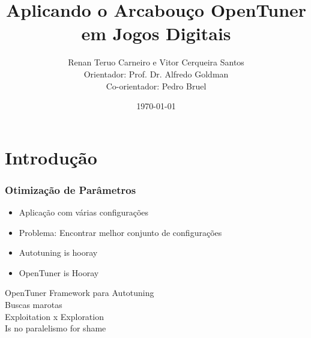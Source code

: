 \documentclass[10pt]{beamer}
\title{Aplicando o Arcabouço OpenTuner em Jogos Digitais}
\date{\today}
\author{Renan Teruo Carneiro e Vitor Cerqueira Santos\\
	Orientador: Prof. Dr. Alfredo Goldman\\
    Co-orientador: Pedro Bruel}
\institute{Instituto de Matemática e Estatística}
\begin{document}
\maketitle


\section{Introdução}

\begin{frame}[fragile]
	\frametitle{Otimização de Parâmetros}
	  \begin{itemize}[<+- | alert@+>]
	  	\item Aplicação com várias configurações
	  	\item Problema: Encontrar melhor conjunto de configurações
	  	\item Autotuning is hooray
	  	\item OpenTuner is Hooray
	  \end{itemize}
\end{frame}

\begin{frame}{OpenTuner}
	Framework para Autotuning\pause\\
	Buscas marotas\pause\\
	Exploitation x Exploration\pause\\
	Is no paralelismo for shame
\end{frame}
%
%  
%
%
\end{document}
